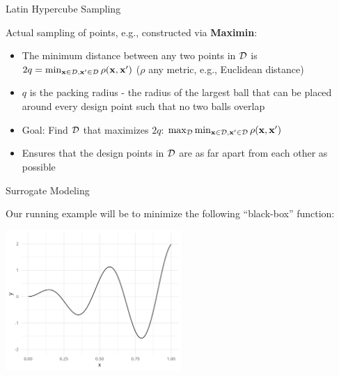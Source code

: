 \documentclass[11pt,compress,t,notes=noshow, xcolor=table]{beamer}
\begin{document}
\begin{frame}{Latin Hypercube Sampling}

Actual sampling of points, e.g., constructed via \textbf{Maximin}:\\
\begin{itemize}
\item The minimum distance between any two points in $\mathcal{D}$ is $2q = \min_{\mathbf{x} \in \mathcal{D}, \mathbf{x}' \in \mathcal{D}} \rho(\mathbf{x}, \mathbf{x}')$ ($\rho$ any metric, e.g., Euclidean distance)
\item $q$ is the packing radius - the radius of the largest ball that can be placed around every design point such that no two balls overlap
\item Goal: Find $\mathcal{D}$ that maximizes $2q$: $\max_{\mathcal{D}} \min_{\mathbf{x} \in \mathcal{D}, \mathbf{x}' \in \mathcal{D}} \rho(\mathbf{x}, \mathbf{x}')$
\item Ensures that the design points in $\mathcal{D}$ are as far apart from each other as possible
\end{itemize}

\end{frame}

\begin{frame}{Surrogate Modeling}

Our running example will be to minimize the following \enquote{black-box} function:

\begin{center}
  \includegraphics[width = 0.5\textwidth]{figure_man/loop_0.png}
\end{center}

\end{frame}
\end{document}
